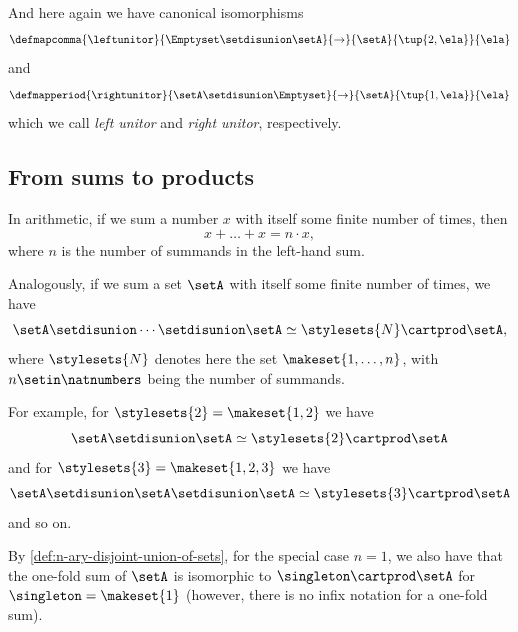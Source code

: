 And here again we have canonical isomorphisms
\begin{equation}\label{eq:leftunitor-sets-sum}
    \defmapcomma{
        \leftunitor
    }{
        \Emptyset \setdisunion \setA
    }{
        \to
    }{
        \setA
    }{
        \tup{2, \ela}
    }{
        \ela
    }
\end{equation}
and
\begin{equation}\label{eq:rightunitor-sets-sum}
    \defmapperiod{
        \rightunitor
    }{
        \setA \setdisunion \Emptyset
    }{
        \to
    }{
        \setA
    }{
        \tup{1, \ela}
    }{
        \ela
    }
\end{equation}
which we call \emph{left unitor} and \emph{right unitor}, respectively.

\subsection{From sums to products}

In arithmetic, if we sum a number $x$ with itself some finite number  of times, then 
\begin{equation}
x + \dots + x = n \cdot x,
\end{equation}
where $n$ is the number of summands in the left-hand sum. 

Analogously, if we sum a set $\setA$ with itself some finite number of times, we have
\begin{equation}
\setA \setdisunion \cdots \setdisunion \setA \simeq \stylesets{N} \cartprod \setA,
\end{equation}
where $\stylesets{N}$ denotes here the set $\makeset{1, \dots ,n}$, with $n \setin \natnumbers$ being the number of summands. 

For example, for $\stylesets{2} = \makeset{1,2}$ we have 
\begin{equation}
\setA \setdisunion \setA \simeq \stylesets{2} \cartprod \setA
\end{equation}
and for $\stylesets{3} = \makeset{1,2, 3}$ we have 
\begin{equation}
\setA \setdisunion \setA \setdisunion \setA \simeq \stylesets{3} \cartprod \setA
\end{equation}
and so on. 

By \cref{def:n-ary-disjoint-union-of-sets}, for the special case $n =1$, we also have that the one-fold sum of $\setA$ is isomorphic to $\singleton \cartprod \setA$ for $\singleton = \makeset{1}$ (however, there is no infix notation for a one-fold sum).





